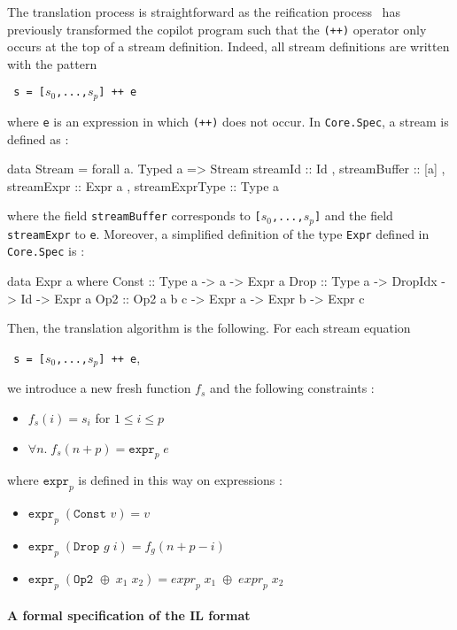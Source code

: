 The translation process is straightforward as the reification process~\cite{} has previously transformed the copilot program such that the \texttt{(++)} operator only occurs at the top of a stream definition. Indeed, all stream definitions are written with the pattern
\begin{center}\texttt{ s = [$s_0$,...,$s_p$] ++ e}\end{center}
where \texttt{e} is an expression in which \texttt{(++)} does not occur. In \texttt{Core.Spec}, a stream is defined as :
\begin{code}
data Stream = forall a. Typed a => Stream
  { streamId         :: Id
  , streamBuffer     :: [a]
  , streamExpr       :: Expr a
  , streamExprType   :: Type a }
\end{code}
where the field \texttt{streamBuffer} corresponds to \texttt{[$s_0$,...,$s_p$]} and the field \texttt{streamExpr} to \texttt{e}. Moreover, a simplified definition of the type \texttt{Expr} defined in \texttt{Core.Spec} is :
\begin{code}
data Expr a where
  Const  :: Type a -> a -> Expr a
  Drop   :: Type a -> DropIdx -> Id -> Expr a
  Op2    :: Op2 a b c -> Expr a -> Expr b -> Expr c
\end{code}
Then, the translation algorithm is the following. For each stream equation \begin{center}\texttt{ s = [$s_0$,...,$s_p$] ++ e},\end{center}we introduce a new fresh function $f_s$ and the following constraints :

\begin{itemize}
\item $f_s(i) = s_i$ \quad for $1 \leq i \leq p$
\item $\forall n . \; f_s(n + p) = \texttt{expr}_p \; e$
\end{itemize}
where $\texttt{expr}_p$ is defined in this way on expressions :
\begin{itemize}
\item $\texttt{expr}_p \; (\texttt{Const } v) = v$
\item $\texttt{expr}_p \; (\texttt{Drop } g \; i) = f_g(n + p - i)$
\item $\texttt{expr}_p \; (\texttt{Op2 } \oplus \; x_1 \; x_2) =  {expr}_p \; x_1 \; \oplus \; {expr}_p \; x_2 $
\end{itemize}


\paragraph{A formal specification of the IL format} 


